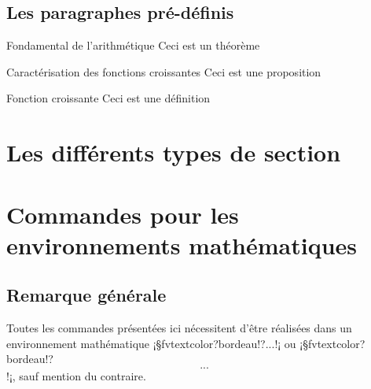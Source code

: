 \documentclass[11pt,a4paper,rgb]{report}
\begin{document}
\subsection{Les paragraphes pré-définis}
\begin{theoreme}{Fondamental de l'arithmétique}
Ceci est un théorème
\end{theoreme}

\begin{proposition}{Caractérisation des fonctions croissantes}
Ceci est une proposition
\end{proposition}

\begin{definition}{Fonction croissante}
Ceci est une définition
\end{definition}

\section{Les différents types de section}

\iffalse
\resizebox{.5\textwidth}{!}{%
\vspace*{2.8cm}
\chapterBackgroundImage{1}{Les nombres complexes}
}

\resizebox{.5\textwidth}{!}{%
\vspace*{2.8cm}
\chapterBackgroundImageTransparencyWithoutToc{1}{Les nombres complexes}
}

\resizebox{.5\textwidth}{!}{%
\vspace*{2.8cm}
\chapterBackgroundImageTransparency{1}{Les nombres complexes}
}

\resizebox{.5\textwidth}{!}{%
\chapterBigFigureAndVerticalRule{1}{Les nombres complexes}
}

\resizebox{.5\textwidth}{!}{%
\chapterBigFigureAndRule{1}{Les nombres complexes}
}

\resizebox{.5\textwidth}{!}{
\vspace*{2.8cm}
\chapterBigFigureColoredBackground{1}{Les nombres complexes}
}
\fi

\section{Commandes pour les environnements mathématiques}
\subsection{Remarque générale}
Toutes les commandes présentées ici nécessitent d'être réalisées dans un environnement mathématique \inCodeStub¡§fvtextcolor?bordeau!?$...$!¡ ou \inCodeStub¡§fvtextcolor?bordeau!?\[...\]!¡, sauf mention du contraire.
\end{document}
